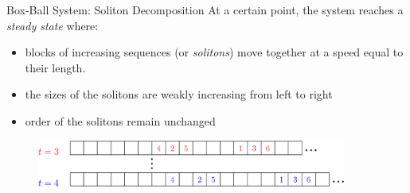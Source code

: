 \documentclass[aspectratio=169, serif]{beamer}
\newcommand{\ph}{\phantom{.}}
\begin{document}
     \begin{frame}{Box-Ball System: Soliton Decomposition}
        At a certain point, the system reaches a \emph{steady state} where:
        \begin{itemize}
            \item blocks of increasing sequences (or \emph{solitons}) move together at a speed equal to their length.
            \item the sizes of the solitons are weakly increasing from left to right
            \item order of the solitons remain unchanged
        \end{itemize}
       
        \begin{figure}
            \centering
            \includegraphics[width = 4in]{ExtraEPS.eps}
        \end{figure}
        
    \end{frame}
\end{document}
